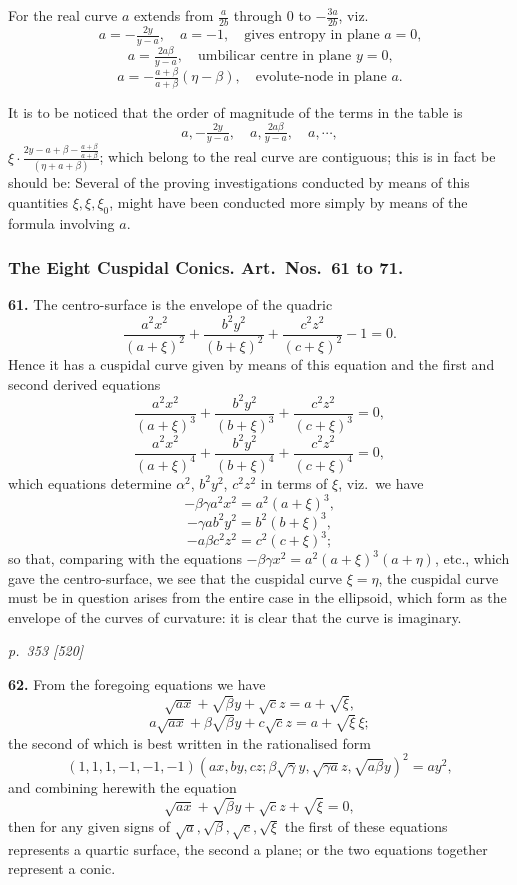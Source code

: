 \documentclass[11pt,a4paper]{article}
\theoremstyle{plain}
\theoremstyle{definition}
\begin{document}
For the real curve $a$ extends from $\tfrac{a}{2b}$ through 0 to $-\tfrac{3a}{2b}$, viz.
\[
a = -\tfrac{2y}{y - a},\quad a = -1,\quad \text{gives entropy in plane $a = 0$,}
\]
\[
a = \tfrac{2a\beta}{y - a},\quad \text{umbilicar centre in plane $y = 0$,}
\]
\[
a = -\tfrac{a + \beta}{a + \beta}(\eta - \beta),\quad \text{evolute-node in plane $a$.}
\]

It is to be noticed that the order of magnitude of the terms in the table is
\[
a, -\tfrac{2y}{y - a},\quad a, \tfrac{2a\beta}{y - a},\quad a, \cdots,
\]
$\xi \cdot \tfrac{2y - a + \beta - \tfrac{a + \beta}{a + \beta}}{(\eta + a + \beta)}$; which belong to the real curve are contiguous; this is in fact be should be: Several of the proving investigations conducted by means of this quantities $\xi, \xi, \xi_0$, might have been conducted more simply by means of the formula involving $a$.

\subsubsection*{The Eight Cuspidal Conics. Art.\ Nos.\ 61 to 71.}

\textbf{61.} The centro-surface is the envelope of the quadric
\[
\frac{a^2 x^2}{(a + \xi)^2} + \frac{b^2 y^2}{(b + \xi)^2} + \frac{c^2 z^2}{(c + \xi)^2} - 1 = 0.
\]
Hence it has a cuspidal curve given by means of this equation and the first and second derived equations
\[
\frac{a^2 x^2}{(a + \xi)^3} + \frac{b^2 y^2}{(b + \xi)^3} + \frac{c^2 z^2}{(c + \xi)^3} = 0,
\]
\[
\frac{a^2 x^2}{(a + \xi)^4} + \frac{b^2 y^2}{(b + \xi)^4} + \frac{c^2 z^2}{(c + \xi)^4} = 0,
\]
which equations determine $\alpha^2$, $b^2 y^2$, $c^2 z^2$ in terms of $\xi$, viz.\ we have
\[
-\beta\gamma a^2 x^2 = a^2(a + \xi)^3,
\]
\[
-\gamma a b^2 y^2 = b^2(b + \xi)^3,
\]
\[
-a\beta c^2 z^2 = c^2(c + \xi)^3;
\]
so that, comparing with the equations $-\beta\gamma x^2 = a^2(a + \xi)^3(a + \eta)$, etc., which gave the centro-surface, we see that the cuspidal curve $\xi = \eta$, the cuspidal curve must be in question arises from the entire case in the ellipsoid, which form as the envelope of the curves of curvature: it is clear that the curve is imaginary.

\clearpage

\bigskip
\textit{p.~353 [520]}
\smallskip

\textbf{62.} From the foregoing equations we have
\[
\sqrt{a x} + \sqrt{\beta}y + \sqrt{c}z = a + \sqrt{\xi},
\]
\[
a\sqrt{a x} + \beta\sqrt{\beta}y + c\sqrt{c}z = a + \sqrt{\xi}\,\xi;
\]
the second of which is best written in the rationalised form
\[
(1, 1, 1, -1, -1, -1)(a x, b y, c z; \beta\sqrt{\gamma}y, \sqrt{\gamma a}z, \sqrt{a\beta}y)^2 = a y^2,
\]
and combining herewith the equation
\[
\sqrt{a x} + \sqrt{\beta}y + \sqrt{c}z + \sqrt{\xi} = 0,
\]
then for any given signs of $\sqrt{a}, \sqrt{\beta}, \sqrt{c}, \sqrt{\xi}$ the first of these equations represents a quartic surface, the second a plane; or the two equations together represent a conic.
\end{document}
